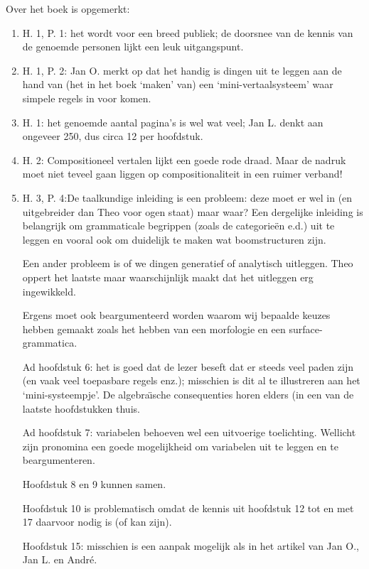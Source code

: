Over het boek is opgemerkt:
 \begin{enumerate}
  \item H. 1, P. 1: het wordt voor een breed publiek; de doorsnee van de kennis
        van de genoemde personen lijkt een leuk uitgangspunt.
  \item H. 1, P. 2: Jan O. merkt op dat het handig is dingen uit te leggen aan
        de hand van (het in het boek `maken' van) 
        een `mini-vertaalsysteem' waar simpele regels in voor komen.
  \item H. 1: het genoemde aantal pagina's is wel wat veel; Jan L. denkt aan 
        ongeveer 250, dus circa 12 per hoofdstuk.
  \item H. 2: Compositioneel vertalen lijkt een goede rode draad. Maar de 
        nadruk moet niet teveel gaan liggen op compositionaliteit in een ruimer
        verband!
  \item H. 3, P. 4:De taalkundige inleiding is een probleem: deze moet er wel
        in (en uitgebreider dan Theo voor ogen staat) maar waar? Een dergelijke
        inleiding is belangrijk om grammaticale begrippen (zoals de 
        categorie\"{e}n e.d.) uit te leggen en vooral ook om duidelijk te maken
        wat boomstructuren zijn. 
   
        Een ander probleem is of we dingen generatief of analytisch uitleggen. 
        Theo oppert het laatste maar waarschijnlijk maakt dat het uitleggen
        erg ingewikkeld. 

        Ergens moet ook beargumenteerd worden waarom wij bepaalde keuzes hebben
        gemaakt zoals het hebben van een morfologie en een surface-grammatica.

        Ad hoofdstuk 6: het is goed dat de lezer beseft dat er steeds veel paden
        zijn (en vaak veel toepasbare regels enz.); misschien is dit al te 
        illustreren aan het `mini-systeempje'. De algebra\"{\i}sche consequenties
        horen elders (in een van de laatste hoofdstukken thuis.

        Ad hoofdstuk 7: variabelen behoeven wel een uitvoerige toelichting.
        Wellicht zijn pronomina een goede mogelijkheid om variabelen uit te
        leggen en te beargumenteren.

        Hoofdstuk 8 en 9 kunnen samen.

        Hoofdstuk 10 is problematisch omdat de kennis uit hoofdstuk 12 tot en 
        met 17 daarvoor nodig is (of kan zijn).
       
        Hoofdstuk 15: misschien is een aanpak mogelijk als in het artikel van 
        Jan O., Jan L. en Andr\'{e}.


\end{enumerate}
